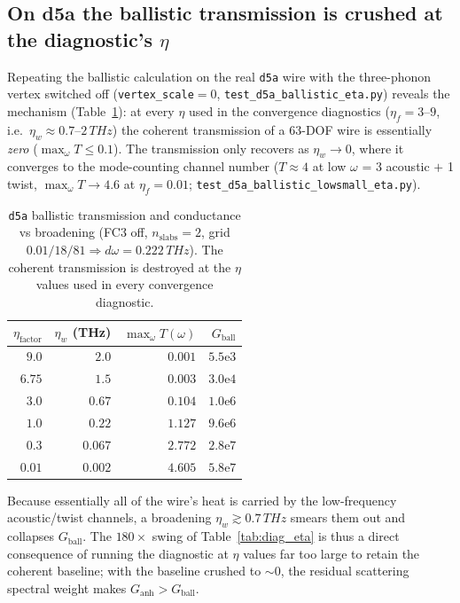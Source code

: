 \subsection{On d5a the ballistic transmission is crushed at the diagnostic's $\eta$}
\label{sec:diag_d5a_ball}

Repeating the ballistic calculation on the real \texttt{d5a} wire with the
three-phonon vertex switched off (\texttt{vertex\_scale}$=0$,
\texttt{test\_d5a\_ballistic\_eta.py}) reveals the mechanism
(Table~\ref{tab:diag_d5a_ball}): at every $\eta$ used in the convergence
diagnostics ($\eta_f=3$--$9$, i.e.\ $\eta_w\approx0.7$--$2\,THz$) the coherent
transmission of a $63$-DOF wire is essentially \emph{zero} ($\max_\omega T\le0.1$).
The transmission only recovers as $\eta_w\!\to\!0$, where it converges to the
mode-counting channel number ($T\approx4$ at low $\omega$ = 3 acoustic $+$ 1 twist,
$\max_\omega T\to4.6$ at $\eta_f=0.01$; \texttt{test\_d5a\_ballistic\_lowsmall\_eta.py}).

\begin{table}[t]
  \centering
  \caption{\texttt{d5a} ballistic transmission and conductance vs broadening
    (FC3 off, $n_\text{slabs}=2$, grid $0.01/18/81\Rightarrow d\omega=0.222\,THz$).
    The coherent transmission is destroyed at the $\eta$ values used in every
    convergence diagnostic.}
  \label{tab:diag_d5a_ball}
  \begin{tabular}{rrrr}
    \toprule
    $\eta_\text{factor}$ & $\eta_w$ (THz) & $\max_\omega T(\omega)$ & $G_\text{ball}$\\
    \midrule
    $9.0$  & $2.0$   & $0.001$ & $5.5\mathrm{e}3$\\
    $6.75$ & $1.5$   & $0.003$ & $3.0\mathrm{e}4$\\
    $3.0$  & $0.67$  & $0.104$ & $1.0\mathrm{e}6$\\
    $1.0$  & $0.22$  & $1.127$ & $9.6\mathrm{e}6$\\
    $0.3$  & $0.067$ & $2.772$ & $2.8\mathrm{e}7$\\
    $0.01$ & $0.002$ & $4.605$ & $5.8\mathrm{e}7$\\
    \bottomrule
  \end{tabular}
\end{table}

Because essentially all of the wire's heat is carried by the low-frequency
acoustic/twist channels, a broadening $\eta_w\gtrsim0.7\,THz$ smears them out
and collapses $G_\text{ball}$. The $180\times$ swing of
Table~\ref{tab:diag_eta} is thus a direct consequence of running the diagnostic at
$\eta$ values far too large to retain the coherent baseline; with the baseline
crushed to $\sim0$, the residual scattering spectral weight makes
$G_\text{anh}>G_\text{ball}$.

